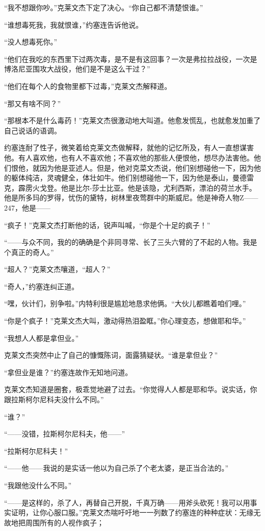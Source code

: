     “我不想跟你吵。”克莱文杰下定了决心。“你自己都不清楚恨谁。”

    “谁想毒死我，我就恨谁，”约塞连告诉他说。

    “没人想毒死你。”

    “他们在我吃的东西里下过两次毒，是不是有这回事？一次是弗拉拉战役，一次是博洛尼亚围攻大战役，他们是不是这么干过？”

    “他们在每个人的食物里都下过毒，”克莱文杰解释道。

    “那又有啥不同？”

    “那根本不是什么毒药！”克莱文杰很激动地大叫道。他愈发慌乱，也就愈发加重了自己说话的语调。

    约塞连耐了性子，微笑着给克莱文杰做解释，就他的记忆所及，有人一直想谋害他。有人喜欢他，也有人不喜欢他；不喜欢他的那些人便恨他，想尽办法害他。他们恨他，就因为他是亚述人。但是，他对克菜文杰说，他们别想碰他一下，因为他的躯体纯洁，灵魂健全，体壮如牛。他们别想碰他一下，因为他是泰山，曼德雷克，霹雳火戈登。他是比尔-莎士比亚。他是该隐，尤利西斯，漂泊的荷兰水手。他是所多玛的罗得，忧伤的黛特，树林里夜莺群中的斯威尼。他是神奇人物Z——247，他是——

    “疯子！”克莱文杰打断他的话，锐声叫喊，“你是个十足的疯子！”

    “——与众不同，我的的确确是个非同寻常、长了三头六臂的了不起的人物。我是个真正的奇人。”

    “超人？”克莱文杰嚷道，“超人？”

    “奇人，”约塞连纠正道。

    “嘿，伙计们，别争啦。”内特利很是尴尬地恳求他俩。“大伙儿都瞧着咱们哩。”

    “你是个疯子！”克莱文杰大叫，激动得热泪盈眶。”你心理变态，想做耶和华。”

    “我想人人都是拿但业。”

    克莱文杰突然中止了自己的慷慨陈词，面露猜疑状。“谁是拿但业？”

    “拿但业是谁？”约塞连故作无知地问道。

    克莱文杰知道是圈套，极乖觉地避了过去。“你觉得人人都是耶和华。说实话，你跟拉斯柯尔尼科夫没什么不同。”

    “谁？”

    “——没错，拉斯柯尔尼科夫，他——”

    “拉斯柯尔尼科夫！”

    “——他——我说的是实话一他以为自己杀了个老太婆，是正当合法的。”

    “我跟他没什么不同。”

    “——是这样的，杀了人，再替自己开脱，千真万确——用斧头砍死！我可以用事实证明，让你心服口服。”克莱文杰喘吁吁地一一列数了约塞连的种种症状：无缘无故地把周围所有的人视作疯子；

